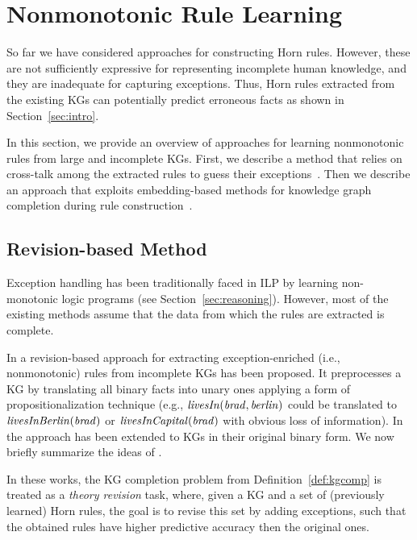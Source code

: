 \section{Nonmonotonic Rule Learning}\label{sec:nmrulelearn}
So far we have considered approaches for constructing Horn rules. However,  these are not sufficiently expressive for representing incomplete human knowledge, and they are inadequate for capturing
exceptions. Thus, Horn rules extracted from the existing KGs can potentially %
predict erroneous facts as shown in Section~\ref{sec:intro}. 

In this section, we provide an overview of approaches for learning nonmonotonic rules from large and incomplete KGs. First, we describe a method that relies on cross-talk among the extracted rules to guess their exceptions~\cite{gad2016,rumis}. Then we describe an approach that exploits embedding-based methods for knowledge graph completion during rule construction~\cite{thinh2018}.

\subsection{Revision-based Method}
Exception handling has been traditionally faced in ILP by learning non-monotonic logic programs \cite{DBLP:conf/ijcai/InoueK97,DBLP:journals/tocl/Sakama05,XHAIL,CorapiRL10,ILASP_system} (see Section~\ref{sec:reasoning}). However, most of the existing methods assume that the data from which the rules are extracted is complete.

In \cite{gad2016} a revision-based approach for extracting exception-enriched (i.e., nonmonotonic) rules from incomplete KGs has been proposed. 
It preprocesses a KG by translating all binary facts into unary ones applying a form of propositionalization technique \cite{propos} (e.g., $\mathit{livesIn(brad,berlin)}$ could be translated to $\mathit{livesInBerlin(brad)}$ or $\mathit{livesInCapital(brad)}$ with obvious loss of information). In \cite{rumis} the approach has been extended to KGs in their original binary form. We now briefly summarize the ideas of  \cite{gad2016,rumis}.

In these works, the KG completion problem from Definition~\ref{def:kgcomp} is treated 
as a \emph{theory revision} task, where, given a KG and a set of (previously learned) Horn rules, the goal is to revise this set by adding exceptions, such that the obtained rules have higher predictive accuracy then the original ones. 

